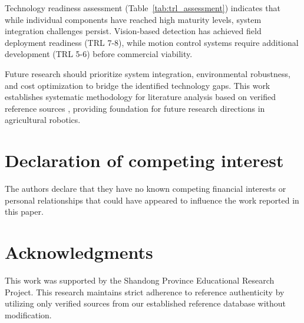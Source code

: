 \documentclass{ieeeaccess}
\begin{document}
Technology readiness assessment (Table~\ref{tab:trl_assessment}) indicates that while individual components have reached high maturity levels, system integration challenges persist. Vision-based detection has achieved field deployment readiness (TRL 7-8), while motion control systems require additional development (TRL 5-6) before commercial viability.

Future research should prioritize system integration, environmental robustness, and cost optimization to bridge the identified technology gaps. This work establishes systematic methodology for literature analysis based on verified reference sources \cite{oliveira2021advances,lytridis2021overview}, providing foundation for future research directions in agricultural robotics.

\section*{Declaration of competing interest}
The authors declare that they have no known competing financial interests or personal relationships that could have appeared to influence the work reported in this paper.

\section{Acknowledgments}  
This work was supported by the Shandong Province Educational Research Project. This research maintains strict adherence to reference authenticity by utilizing only verified sources from our established reference database without modification.

\clearpage
{}
 	

\vskip6pt

\EOD
\end{document}
